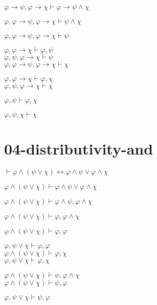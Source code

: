 \documentclass[a4paper,12pt]{article}
\begin{document}
$\varphi \to \psi, \varphi \to \chi \vdash \varphi \to \psi \land \chi$

$\varphi, \varphi \to \psi, \varphi \to \chi \vdash \psi \land \chi$

$\varphi, \varphi \to \psi, \varphi \to \chi \vdash \psi$

$\varphi, \varphi \to \chi \vdash \varphi, \psi$ \\


$\varphi, \psi, \varphi \to \chi \vdash \psi$ \\


$\varphi, \varphi \to \psi, \varphi \to \chi \vdash \chi$

$\varphi, \varphi \to \chi \vdash \varphi, \chi$ \\


$\varphi, \psi, \varphi \to \chi \vdash \chi$

$\varphi, \psi \vdash \varphi, \chi$

$\varphi, \psi, \chi \vdash \chi$

\section*{04-distributivity-and}

$\vdash \varphi \land (\psi \lor \chi) \leftrightarrow \varphi \land \psi \lor \varphi \land \chi$

$\varphi \land (\psi \lor \chi) \vdash \varphi \land \psi \lor \varphi \land \chi$

$\varphi \land (\psi \lor \chi) \vdash \varphi \land \psi, \varphi \land \chi$

$\varphi \land (\psi \lor \chi) \vdash \varphi, \varphi \land \chi$

$\varphi \land (\psi \lor \chi) \vdash \varphi, \varphi$

$\varphi, \psi \lor \chi \vdash \varphi, \varphi$ \\


$\varphi \land (\psi \lor \chi) \vdash \varphi, \chi$ \\

$\varphi, \psi \lor \chi \vdash \varphi, \chi$


$\varphi \land (\psi \lor \chi) \vdash \psi, \varphi \land \chi$ \\

$\varphi \land (\psi \lor \chi) \vdash \psi, \varphi$

$\varphi, \psi \lor \chi \vdash \psi, \varphi$ \\
\end{document}
